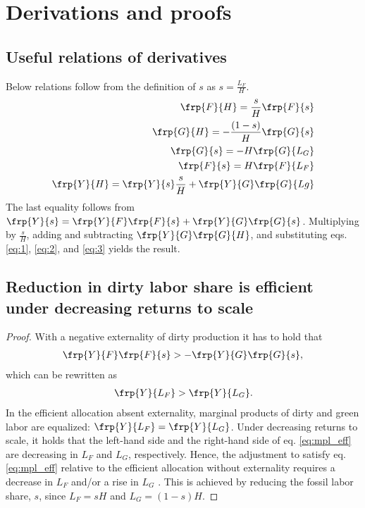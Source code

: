 
\section{Derivations and proofs}\label{app:derivations}

\subsection{Useful relations of derivatives}\label{app:dervs_use}
Below relations follow from the definition of $s$ as $s=\frac{L_F}{H}$.
\begin{align}
\frp{F}{H}=\frac{s}{H}\frp{F}{s}\label{eq:1}\\
\frp{G}{H}=-\frac{(1-s)}{H}\frp{G}{s}\label{eq:2}\\
\frp{G}{s}=-H\frp{G}{L_G}\label{eq:3}\\
\frp{F}{s}=H\frp{F}{L_F}\nonumber\\
\frp{Y}{H}= \frp{Y}{s}\frac{s}{H}+\frp{Y}{G}\frp{G}{Lg}\nonumber
\end{align}
The last equality follows from $\frp{Y}{s}=\frp{Y}{F}\frp{F}{s}+\frp{Y}{G}\frp{G}{s}$. Multiplying by $\frac{s}{H}$, adding and subtracting $\frp{Y}{G}\frp{G}{H}$, and substituting eqs. \eqref{eq:1}, \eqref{eq:2}, and \eqref{eq:3} yields the result. 
\subsection{Reduction in dirty labor share is efficient under decreasing returns to scale}\label{app:redeffs}
\begin{proof}
	With a negative externality of dirty production it has to hold that 
	\begin{align*}
	\frp{Y}{F}\frp{F}{s}>-\frp{Y}{G}\frp{G}{s},
	\end{align*}
	which can be rewritten as 
	\begin{align}\label{eq:mpl_eff}
	\frp{Y}{L_F}>\frp{Y}{L_G}. 
	\end{align}
	In the efficient allocation absent externality, marginal products of dirty and green labor are equalized: $\frp{Y}{L_F}=\frp{Y}{L_G}$. 
	Under decreasing returns to scale, it holds that the left-hand side and the right-hand side of eq. \eqref{eq:mpl_eff} are decreasing in $L_F$ and $L_G$, respectively. Hence, the adjustment to satisfy eq. \eqref{eq:mpl_eff} relative to the efficient allocation without externality requires a decrease in $L_F$ and/or a rise in $L_G$  .
	This is achieved by reducing the fossil labor share, $s$, since $L_F=sH$ and $L_G=(1-s)H$.	
\end{proof}


